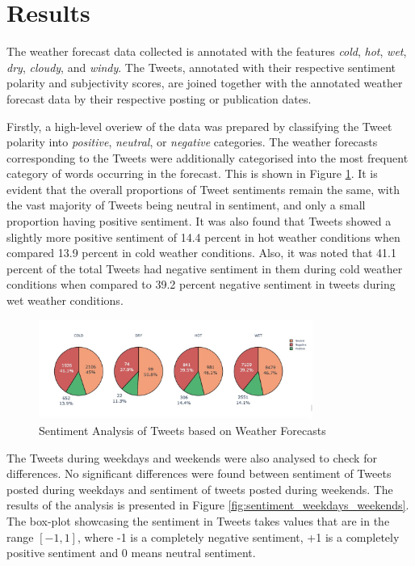 \documentclass[a4paper,10pt]{article}
\begin{document}
    \section{Results}
    \label{results}

    The weather forecast data collected is annotated with the features \textit{cold}, \textit{hot}, \textit{wet}, \textit{dry}, \textit{cloudy}, and \textit{windy}. The Tweets, annotated with their respective sentiment polarity and subjectivity scores, are joined together with the annotated weather forecast data by their respective posting or publication dates.
    
    Firstly, a high-level overiew of the data was prepared by classifying the Tweet polarity into \textit{positive}, \textit{neutral}, or \textit{negative} categories. The weather forecasts corresponding to the Tweets were additionally categorised into the most frequent category of words occurring in the forecast. This is shown in Figure \ref{fig:analysis_sentiment_weather}. It is evident that the overall proportions of Tweet sentiments remain the same, with the vast majority of Tweets being neutral in sentiment, and only a small proportion having positive sentiment. It was also found that Tweets showed a slightly more positive sentiment of 14.4 percent in hot weather conditions when compared 13.9 percent in cold weather conditions. Also, it was noted that 41.1 percent of the total Tweets had negative sentiment in them during cold weather conditions when compared to 39.2 percent negative sentiment in tweets during wet weather conditions. 

    \begin{figure}
        \includegraphics[width=0.8\textwidth]{analysis_sentiment_weather.jpg}
        \caption{Sentiment Analysis of Tweets based on Weather Forecasts}
        \label{fig:analysis_sentiment_weather}
    \end{figure}
    
    The Tweets during weekdays and weekends were also analysed to check for differences. No significant differences were found between sentiment of Tweets posted during weekdays and sentiment of tweets posted during weekends. The results of the analysis is presented in Figure \ref{fig:sentiment_weekdays_weekends}. The box-plot showcasing the sentiment in Tweets takes values that are in the range $[-1, 1]$, where -1 is a completely negative sentiment, +1 is a completely positive sentiment and 0 means neutral sentiment.
\end{document}
